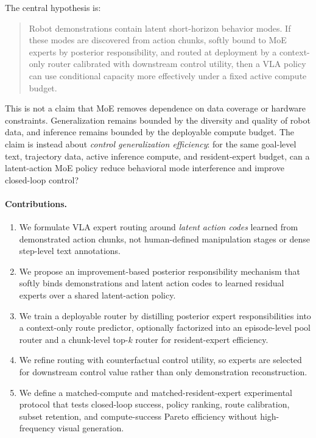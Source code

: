 \documentclass[10pt]{article}
\begin{document}
The central hypothesis is:
\begin{quote}
Robot demonstrations contain latent short-horizon behavior modes. If these modes are discovered from action chunks, softly bound to MoE experts by posterior responsibility, and routed at deployment by a context-only router calibrated with downstream control utility, then a VLA policy can use conditional capacity more effectively under a fixed active compute budget.
\end{quote}

This is not a claim that MoE removes dependence on data coverage or hardware constraints. Generalization remains bounded by the diversity and quality of robot data, and inference remains bounded by the deployable compute budget. The claim is instead about \emph{control generalization efficiency}: for the same goal-level text, trajectory data, active inference compute, and resident-expert budget, can a latent-action MoE policy reduce behavioral mode interference and improve closed-loop control?

\paragraph{Contributions.}
\begin{enumerate}
  \item We formulate VLA expert routing around \emph{latent action codes} learned from demonstrated action chunks, not human-defined manipulation stages or dense step-level text annotations.
  \item We propose an improvement-based posterior responsibility mechanism that softly binds demonstrations and latent action codes to learned residual experts over a shared latent-action policy.
  \item We train a deployable router by distilling posterior expert responsibilities into a context-only route predictor, optionally factorized into an episode-level pool router and a chunk-level top-$k$ router for resident-expert efficiency.
  \item We refine routing with counterfactual control utility, so experts are selected for downstream control value rather than only demonstration reconstruction.
  \item We define a matched-compute and matched-resident-expert experimental protocol that tests closed-loop success, policy ranking, route calibration, subset retention, and compute-success Pareto efficiency without high-frequency visual generation.
\end{enumerate}
\end{document}
